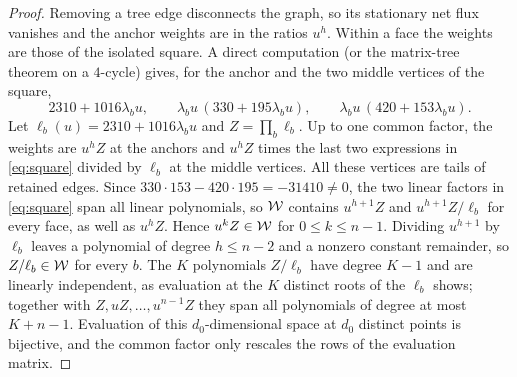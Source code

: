\begin{proof}
Removing a tree edge disconnects the graph, so its stationary net flux vanishes and the anchor
weights are in the ratios \(u^h\). Within a face the weights are those of the isolated square.
A direct computation (or the matrix-tree theorem on a \(4\)-cycle) gives, for the anchor and
the two middle vertices of the square,
\begin{equation}\label{eq:square}
 2310+1016\lambda_bu,\qquad
 \lambda_bu\,(330+195\lambda_bu),\qquad \lambda_bu\,(420+153\lambda_bu).
\end{equation}
Let \(\ell_b(u)=2310+1016\lambda_bu\) and \(Z=\prod_b\ell_b\). Up to one common factor, the
weights are \(u^hZ\) at the anchors and \(u^{h}Z\) times the last two expressions in
\eqref{eq:square} divided by \(\ell_b\) at the middle vertices. All these vertices are tails of
retained edges. Since \(330\cdot153-420\cdot195=-31410\ne0\), the two linear factors in
\eqref{eq:square} span all linear polynomials, so \(\mathcal W\) contains \(u^{h+1}Z\) and
\(u^{h+1}Z/\ell_b\) for every face, as well as \(u^hZ\). Hence \(u^kZ\in\mathcal W\) for
\(0\le k\le n-1\). Dividing \(u^{h+1}\) by \(\ell_b\) leaves a polynomial of degree \(h\le n-2\)
and a nonzero constant remainder, so \(Z/\ell_b\in\mathcal W\) for every \(b\). The \(K\) polynomials
\(Z/\ell_b\) have degree \(K-1\) and are linearly independent, as evaluation at the \(K\)
distinct roots of the \(\ell_b\) shows; together with \(Z,uZ,\dots,u^{n-1}Z\) they span all
polynomials of degree at most \(K+n-1\). Evaluation of this \(d_0\)-dimensional space at
\(d_0\) distinct points is bijective, and the common factor only rescales the rows of the
evaluation matrix.
\end{proof}

